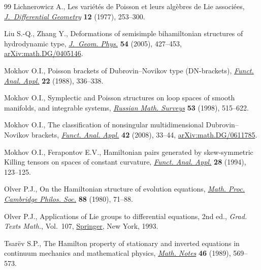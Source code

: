 \documentclass[pdftex]{sigma}
\numberwithin{equation}{section}
\begin{document}
\begin{thebibliography}{99}
Lichnerowicz A., Les vari\'et\'es de {P}oisson et leurs alg\`ebres de {L}ie
 associ\'ees, \href{https://doi.org/10.4310/jdg/1214433987}{\textit{J.~Differential Geometry}} \textbf{12} (1977), 253--300.

Liu S.-Q., Zhang Y., Deformations of semisimple bihamiltonian structures of
 hydrodynamic type, \href{https://doi.org/10.1016/j.geomphys.2004.11.003}{\textit{J.~Geom. Phys.}} \textbf{54} (2005), 427--453,
 \href{https://arxiv.org/abs/math.DG/0405146}{arXiv:math.DG/0405146}.

Mokhov O.I., Poisson brackets of {D}ubrovin--{N}ovikov type ({DN}-brackets),
 \href{https://doi.org/10.1007/BF01077434}{\textit{Funct. Anal. Appl.}} \textbf{22} (1988), 336--338.

Mokhov O.I., Symplectic and {P}oisson structures on loop spaces of smooth
 manifolds, and integrable systems, \href{https://doi.org/10.1070/RM1998v053n03ABEH000019}{\textit{Russian Math. Surveys}} \textbf{53}
 (1998), 515--622.

Mokhov O.I., The classification of nonsingular multidimensional
 {D}ubrovin--{N}ovikov brackets, \href{https://doi.org/10.1007/s10688-008-0004-8}{\textit{Funct. Anal. Appl.}} \textbf{42}
 (2008), 33--44, \href{https://arxiv.org/abs/math.DG/0611785}{arXiv:math.DG/0611785}.

Mokhov O.I., Ferapontov E.V., Hamiltonian pairs generated by skew-symmetric
 {K}illing tensors on spaces of constant curvature, \href{https://doi.org/10.1007/BF01076502}{\textit{Funct. Anal.
 Appl.}} \textbf{28} (1994), 123--125.

Olver P.J., On the {H}amiltonian structure of evolution equations,
 \href{https://doi.org/10.1017/S0305004100057364}{\textit{Math. Proc. Cambridge Philos. Soc.}} \textbf{88} (1980), 71--88.

Olver P.J., Applications of {L}ie groups to differential equations, 2nd ed.,
 \textit{Grad. Texts Math.}, Vol.~107, \href{https://doi.org/10.1007/978-1-4612-4350-2}{Springer}, New York, 1993.

Tsar\"ev S.P., The {H}amilton property of stationary and inverted equations in
 continuum mechanics and mathematical physics, \href{https://doi.org/10.1007/BF01159109}{\textit{Math. Notes}}
 \textbf{46} (1989), 569--573.


\end{thebibliography}
\end{document}
